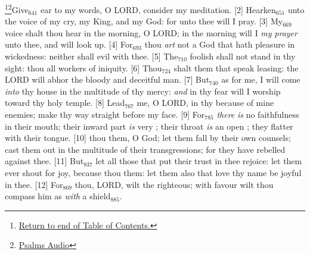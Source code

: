 \footnote{\textcolor[cmyk]{0.99998,1,0,0}{\hyperlink{TOC}{Return to end of Table of Contents.}}}\footnote{\href{https://audiobible.com/bible/bible.html}{\textcolor[cmyk]{0.99998,1,0,0}{Psalms Audio}}}\textcolor[cmyk]{0.99998,1,0,0}{Give\textcolor{jungle}{$_{641}$} ear to my words, O LORD, consider my meditation.}
[2] \textcolor[cmyk]{0.99998,1,0,0}{Hearken\textcolor{jungle}{$_{651}$} unto the voice of my cry, my King, and my God: for unto thee will I pray.}
[3] \textcolor[cmyk]{0.99998,1,0,0}{My\textcolor{jungle}{$_{669}$} voice shalt thou hear in the morning, O LORD; in the morning will I  \emph{my} \emph{prayer} unto thee, and will look up.}
[4] \textcolor[cmyk]{0.99998,1,0,0}{For\textcolor{jungle}{$_{693}$} thou \emph{art} not a God that hath pleasure in wickedness: neither shall evil  with thee.}
[5] \textcolor[cmyk]{0.99998,1,0,0}{The\textcolor{jungle}{$_{710}$} foolish shall not stand in thy sight: thou  all workers of iniquity.}
[6] \textcolor[cmyk]{0.99998,1,0,0}{Thou\textcolor{jungle}{$_{724}$} shalt  them that speak leasing: the LORD will abhor the bloody and deceitful man.}
[7] \textcolor[cmyk]{0.99998,1,0,0}{But\textcolor{jungle}{$_{740}$} as for me, I will come \emph{into} thy house in the multitude of thy mercy: \emph{and} in thy fear will I worship toward thy holy temple.}
[8] \textcolor[cmyk]{0.99998,1,0,0}{Lead\textcolor{jungle}{$_{767}$} me, O LORD, in thy  because of mine enemies; make thy way straight before my face.}
[9] \textcolor[cmyk]{0.99998,1,0,0}{For\textcolor{jungle}{$_{785}$} \emph{there} \emph{is} no faithfulness in their mouth; their inward part \emph{is} very ; their throat \emph{is} an open ; they flatter with their tongue.}
[10] \textcolor[cmyk]{0.99998,1,0,0}{ thou them, O God; let them fall by their own counsels; cast them out in the multitude of their transgressions; for they have rebelled against thee.}
[11] \textcolor[cmyk]{0.99998,1,0,0}{But\textcolor{jungle}{$_{837}$} let all those that put their trust in thee rejoice: let them ever shout for joy, because thou  them: let them also that love thy name be joyful in thee.}
[12] \textcolor[cmyk]{0.99998,1,0,0}{For\textcolor{jungle}{$_{869}$} thou, LORD, wilt  the righteous; with favour wilt thou compass him as \emph{with} a shield\textcolor{jungle}{$_{885}$}.}




